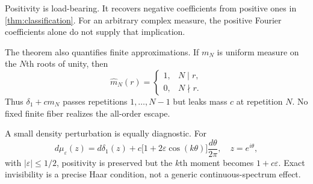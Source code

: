 Positivity is load-bearing.  It recovers negative coefficients from positive
ones in \cref{thm:classification}.  For an arbitrary complex measure, the
positive Fourier coefficients alone do not supply that implication.

The theorem also quantifies finite approximations.  If $m_N$ is uniform
measure on the $N$th roots of unity, then
\[
 \widehat m_N(r)=
 \begin{cases}1,&N\mid r,\\0,&N\nmid r.
 \end{cases}                                               \tag{3.6}
\]
Thus $\delta_1+cm_N$ passes repetitions $1,\ldots,N-1$ but leaks mass $c$ at
repetition $N$.  No fixed finite fiber realizes the all-order escape.

A small density perturbation is equally diagnostic.  For
\[
 d\mu_\varepsilon(z)
 =d\delta_1(z)+c\bigl[1+2\varepsilon\cos(k\theta)\bigr]
   \frac{d\theta}{2\pi},\quad z=e^{i\theta},                \tag{3.7}
\]
with $|\varepsilon|\le1/2$, positivity is preserved but the $k$th moment
becomes $1+c\varepsilon$.  Exact invisibility is a precise Haar condition,
not a generic continuous-spectrum effect.
